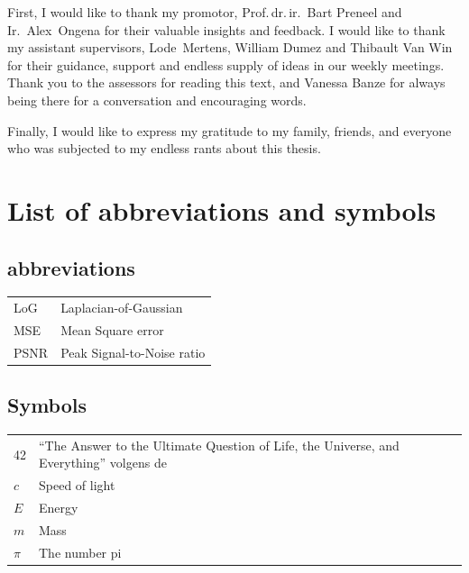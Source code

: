 \documentclass[master=mcs]{kulemt}
\begin{document}
\begin{preface}
First, I would like to thank my promotor, Prof.\,dr.\,ir.\ Bart Preneel and Ir.\ Alex~Ongena for their valuable insights and feedback. I would like to thank my assistant supervisors, Lode~Mertens, William Dumez and Thibault Van Win for their guidance, support and endless supply of ideas in our weekly meetings. Thank you to the assessors for reading this text, and 
Vanessa Banze for always being there for a conversation and encouraging words.

Finally, I would like to express my gratitude to my family, friends, and everyone who was subjected to my endless rants about this thesis. 

\end{preface}

\tableofcontents*

\begin{abstract}
  This \texttt{abstract} environment provides a summary of the work, which may or may not be extensive.
The intention is that this should be limited to 1 page.

  \lipsum[1]
\end{abstract}

\listoffiguresandtables
\chapter{List of abbreviations and symbols}
\section*{abbreviations}
\begin{flushleft}
  \renewcommand{\arraystretch}{1.1}
  \begin{tabularx}{\textwidth}{@{}p{12mm}X@{}}
    LoG   & Laplacian-of-Gaussian \\
    MSE   & Mean Square error \\
    PSNR  & Peak Signal-to-Noise ratio \\
  \end{tabularx}
\end{flushleft}
\section*{Symbols}
\begin{flushleft}
  \renewcommand{\arraystretch}{1.1}
  \begin{tabularx}{\textwidth}{@{}p{12mm}X@{}}
    42    & ``The Answer to the Ultimate Question of Life, the Universe,
            and Everything'' volgens de \cite{h2g2} \\
    $c$   & Speed of light \\
    $E$   & Energy \\
    $m$   & Mass \\
    $\pi$ & The number pi \\
  \end{tabularx}
\end{flushleft}
\end{document}
